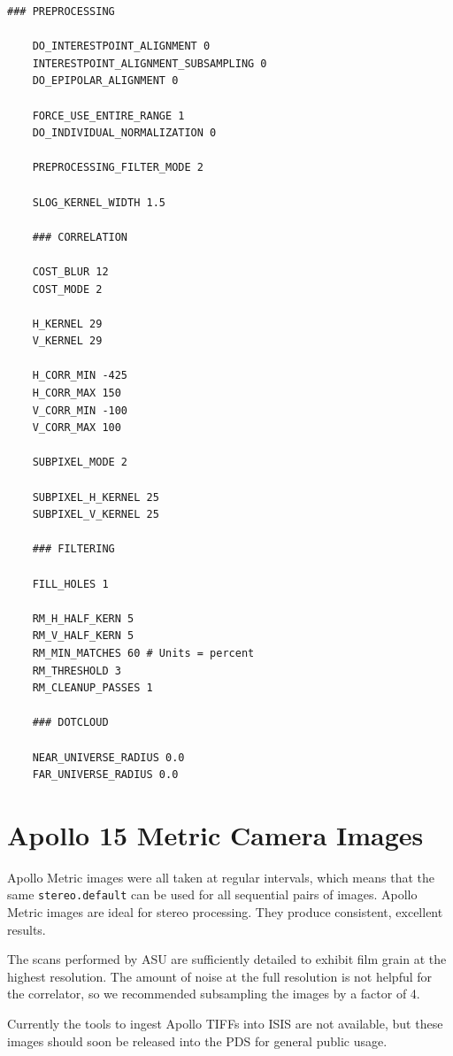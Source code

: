 \begin{center}\begin{minipage}{5.5in}
\begin{Verbatim}[frame=single,fontsize=\small,label=stereo.default for LROC NAC]
    ### PREPROCESSING

    DO_INTERESTPOINT_ALIGNMENT 0
    INTERESTPOINT_ALIGNMENT_SUBSAMPLING 0
    DO_EPIPOLAR_ALIGNMENT 0

    FORCE_USE_ENTIRE_RANGE 1
    DO_INDIVIDUAL_NORMALIZATION 0

    PREPROCESSING_FILTER_MODE 2

    SLOG_KERNEL_WIDTH 1.5

    ### CORRELATION

    COST_BLUR 12
    COST_MODE 2

    H_KERNEL 29
    V_KERNEL 29

    H_CORR_MIN -425
    H_CORR_MAX 150
    V_CORR_MIN -100
    V_CORR_MAX 100

    SUBPIXEL_MODE 2

    SUBPIXEL_H_KERNEL 25
    SUBPIXEL_V_KERNEL 25

    ### FILTERING

    FILL_HOLES 1

    RM_H_HALF_KERN 5
    RM_V_HALF_KERN 5
    RM_MIN_MATCHES 60 # Units = percent
    RM_THRESHOLD 3
    RM_CLEANUP_PASSES 1

    ### DOTCLOUD

    NEAR_UNIVERSE_RADIUS 0.0
    FAR_UNIVERSE_RADIUS 0.0
\end{Verbatim}
\end{minipage}\end{center}

\section{Apollo 15 Metric Camera Images}

Apollo Metric images were all taken at regular intervals, which means
that the same \texttt{stereo.default} can be used for all sequential pairs of
images. Apollo Metric images are ideal for stereo processing.  They
produce consistent, excellent results.

The scans performed by ASU are sufficiently detailed to exhibit film
grain at the highest resolution.  The amount of noise at the full
resolution is not helpful for the correlator, so we recommended
subsampling the images by a factor of 4.

Currently the tools to ingest Apollo TIFFs into ISIS are not
available, but these images should soon be released into the PDS for
general public usage.

